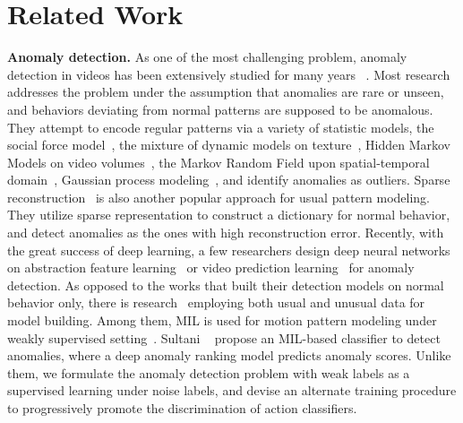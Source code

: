 \documentclass[10pt,twocolumn,letterpaper]{article}
\begin{document}
\section{Related Work}
\textbf{Anomaly detection.} As one of the most challenging problem, anomaly detection in videos has been extensively studied for many years~\cite{kratz2009cvpr,zhao2011sparse,wu2010chaotic,hasan2016regularity,li2014multiscale,anti2011parse,mohammadi2016angry,li2014crowded} . Most research addresses the problem under the assumption that anomalies are rare or unseen, and behaviors deviating from normal patterns are supposed to be anomalous. They attempt to encode regular patterns via a variety of statistic models, \eg the social force model~\cite{mehran2009social}, the mixture of dynamic models on texture~\cite{li2014crowded}, Hidden Markov Models on video volumes~\cite{hospedales2009hmm,kratz2009cvpr}, the Markov Random Field upon spatial-temporal domain~\cite{kim2009mrf}, Gaussian process modeling~\cite{li2015gaussian,cheng2015cvpr}, and identify anomalies as outliers. 
Sparse reconstruction~\cite{lu2013matlab,luo2017sparse,cong2011sparse,zhao2011sparse} is also another popular approach for usual pattern modeling.
They utilize sparse representation to construct a dictionary for normal behavior, and detect anomalies as the ones with high reconstruction error. Recently, with the great success of deep learning, a few researchers design deep neural networks on abstraction feature learning~\cite{hasan2016regularity,chong2017autoencoder,luo2017history} or video prediction learning~\cite{liu2017future} for anomaly detection. As opposed to the works that built their detection models on normal behavior only, there is research~\cite{adhiya2009tracking,he2017anomaly,Sultani_2018_CVPR} employing both usual and unusual data for model building. Among them, MIL is used for motion pattern modeling under weakly supervised setting~\cite{he2017anomaly,Sultani_2018_CVPR}. Sultani \etal~\cite{Sultani_2018_CVPR} propose an MIL-based classifier to detect anomalies, where a deep anomaly ranking model predicts anomaly scores. Unlike them, we formulate the anomaly detection problem with weak labels as a supervised learning under noise labels, and devise an alternate training procedure to progressively promote the discrimination of action classifiers. 
\end{document}
